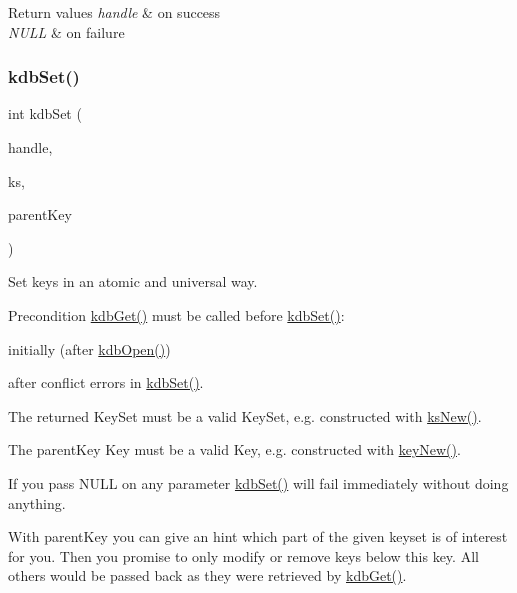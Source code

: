 \begin{DoxyRetVals}{Return values}
{\em handle} & on success \\
\hline
{\em N\+U\+LL} & on failure \\
\hline
\end{DoxyRetVals}
\mbox{\label{group__kdb_ga11436b058408f83d303ca5e996832bcf}} 
\subsubsection{\texorpdfstring{kdb\+Set()}{kdbSet()}}
{\footnotesize\ttfamily int kdb\+Set (\begin{DoxyParamCaption}\item[{K\+DB $\ast$}]{handle,  }\item[{Key\+Set $\ast$}]{ks,  }\item[{Key $\ast$}]{parent\+Key }\end{DoxyParamCaption})}



Set keys in an atomic and universal way. 

\begin{DoxyPrecond}{Precondition}
\hyperlink{group__kdb_ga28e385fd9cb7ccfe0b2f1ed2f62453a1}{kdb\+Get()} must be called before \hyperlink{group__kdb_ga11436b058408f83d303ca5e996832bcf}{kdb\+Set()}\+:
\begin{DoxyItemize}
\item initially (after \hyperlink{group__kdb_ga6808defe5870f328dd17910aacbdc6ca}{kdb\+Open()})
\item after conflict errors in \hyperlink{group__kdb_ga11436b058408f83d303ca5e996832bcf}{kdb\+Set()}.
\end{DoxyItemize}

The {\ttfamily returned} Key\+Set must be a valid Key\+Set, e.\+g. constructed with \hyperlink{group__keyset_ga671e1aaee3ae9dc13b4834a4ddbd2c3c}{ks\+New()}.

The {\ttfamily parent\+Key} Key must be a valid Key, e.\+g. constructed with \hyperlink{group__key_gad23c65b44bf48d773759e1f9a4d43b89}{key\+New()}.
\end{DoxyPrecond}
If you pass N\+U\+LL on any parameter \hyperlink{group__kdb_ga11436b058408f83d303ca5e996832bcf}{kdb\+Set()} will fail immediately without doing anything.

With {\ttfamily parent\+Key} you can give an hint which part of the given keyset is of interest for you. Then you promise to only modify or remove keys below this key. All others would be passed back as they were retrieved by \hyperlink{group__kdb_ga28e385fd9cb7ccfe0b2f1ed2f62453a1}{kdb\+Get()}.

